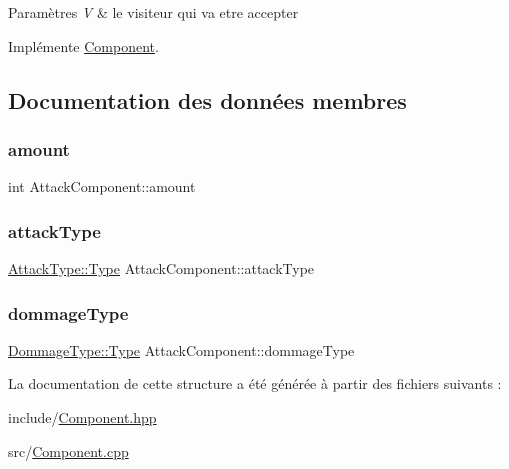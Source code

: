 \begin{DoxyParams}{Paramètres}
{\em V} & le visiteur qui va etre accepter \\
\hline
\end{DoxyParams}


Implémente \hyperlink{structComponent_a1d42068fda4a9bf6571810f669b3bb21}{Component}.



\subsection{Documentation des données membres}
\mbox{\label{structAttackComponent_a7af6243b23e8bdfec8eb75e267622b57}} 
\subsubsection{\texorpdfstring{amount}{amount}}
{\footnotesize\ttfamily int Attack\+Component\+::amount}

\mbox{\label{structAttackComponent_a672c95806b4aad77f6b0aaee6895611f}} 
\subsubsection{\texorpdfstring{attack\+Type}{attackType}}
{\footnotesize\ttfamily \hyperlink{namespaceAttackType_a26a2d73c5f73a06a63a568dcd519d302}{Attack\+Type\+::\+Type} Attack\+Component\+::attack\+Type}

\mbox{\label{structAttackComponent_a324ca9d4107c8f2855d06a845228d29d}} 
\subsubsection{\texorpdfstring{dommage\+Type}{dommageType}}
{\footnotesize\ttfamily \hyperlink{namespaceDommageType_a6e5dff665b7631fe6ec9065dddbebcfd}{Dommage\+Type\+::\+Type} Attack\+Component\+::dommage\+Type}



La documentation de cette structure a été générée à partir des fichiers suivants \+:\begin{DoxyCompactItemize}
\item 
include/\hyperlink{Component_8hpp}{Component.\+hpp}\item 
src/\hyperlink{Component_8cpp}{Component.\+cpp}\end{DoxyCompactItemize}
